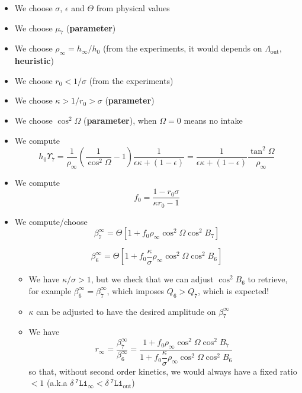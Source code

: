 \documentclass[aps,onecolumn,10pt]{revtex4}
\newcommand{\mychem}[1]{\mathtt{#1}}
\newcommand{\spLi}[1]{{~^{\mychem{#1}}\mychem{Li}}}
\newcommand{\deltaLi}{ {\delta\!\!\!\spLi{7}} }
\newcommand{\deltaLiOut}{{\deltaLi}_{\mathrm{out}}}
\newcommand{\LiAll}{\Lambda}
\newcommand{\LiAllOut}{{\LiAll}_{\mathrm{out}}}
\begin{document}
\begin{itemize}
\item We choose $\sigma$, $\epsilon$ and $\Theta$ from physical values
\item We choose $\mu_7$ (\textbf{parameter})
\item We choose $\rho_\infty=h_\infty/h_0$ (from the experiments, it would depends on $\LiAllOut$, \textbf{heuristic})
\item We choose $r_0<1/\sigma$  (from the experiments)
\item We choose $\kappa>1/r_0>\sigma$ (\textbf{parameter})
\item We choose $\cos^2\Omega$ (\textbf{parameter}), when $\Omega=0$ means no intake
\item We compute 
$$
	h_0\Upsilon_7 = \dfrac{1}{\rho_\infty}\left(\dfrac{1}{\cos^2\Omega}-1\right)\dfrac{1}{\epsilon\kappa+(1-\epsilon)}
	= \dfrac{1}{\epsilon\kappa+(1-\epsilon)} \dfrac{\tan^2\Omega}{\rho_\infty}
$$
\item We compute
$$
	f_0 = \dfrac{1-r_0\sigma}{\kappa r_0-1}
$$
\item We compute/choose
$$
	\beta_7^\infty = \Theta \left[ 1 + f_0 \rho_\infty \cos^2\Omega \cos^2 B_7 \right]
$$

$$	
	\beta_6^\infty = \Theta \left[ 1 + f_0 \dfrac{\kappa}{\sigma} \rho_\infty \cos^2\Omega \cos^2 B_6 \right]
$$
\begin{itemize}
\item
We have $\kappa/\sigma>1$, but we check that we can adjust $\cos^2 B_6$ to retrieve, for example $\beta_6^\infty=\beta_7^\infty$, which imposes
$Q_6>Q_7$, which is expected!
\item $\kappa$ can be adjusted to have the desired amplitude on $\beta_7^\infty$
\item We have
$$
	r_\infty = \dfrac{\beta_7^\infty}{\beta_6^\infty} = \dfrac{ 1 + f_0 \rho_\infty \cos^2\Omega \cos^2 B_7}{1 + f_0 \dfrac{\kappa}{\sigma} \rho_\infty \cos^2\Omega \cos^2 B_6}
$$
so that, without second order kinetics, we would always have a fixed ratio $<1$ (a.k.a $\deltaLi_\infty<\deltaLiOut$)
\end{itemize}
\end{itemize}
\end{document}
